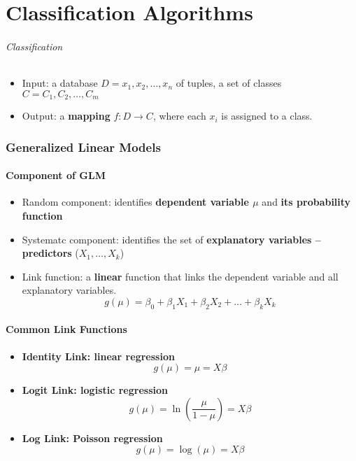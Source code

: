 
\part{Classification Algorithms}
\paragraph{Classification} 
\begin{itemize}
	\item Input: a database $D = {x_1, x_2, \dots, x_n}$ of tuples, a set of classes $C = {C_1, C_2, \dots, C_m}$
	\item Output: a \textbf{mapping} $f: D\rightarrow C$, where each $x_i$ is assigned to a class. 
\end{itemize}
\section{Generalized Linear Models}
\subsection{Component of GLM}
\begin{itemize}
	\item Random component: identifies \textbf{dependent variable $\mu$} and \textbf{its probability function}
	\item Systematc component: identifies the set of \textbf{explanatory variables -- predictors} ($X_1, \dots, X_k$)
	\item Link function: a \textbf{linear} function that links the dependent variable and all explanatory variables.
	$$g(\mu) = \beta_0 + \beta_1 X_1 + \beta_2 X_2 + \dots + \beta_k X_k$$
\end{itemize}
\subsection{Common Link Functions}
\begin{itemize}
	\item \textbf{Identity Link: linear regression}
	$$g(\mu) = \mu = X\beta$$
	\item \textbf{Logit Link: logistic regression}
	$$g(\mu) = \ln(\frac{\mu}{1 - \mu}) = X\beta $$
	\item \textbf{Log Link: Poisson regression}
	$$g(\mu) = \log(\mu) =  X\beta$$
\end{itemize}
